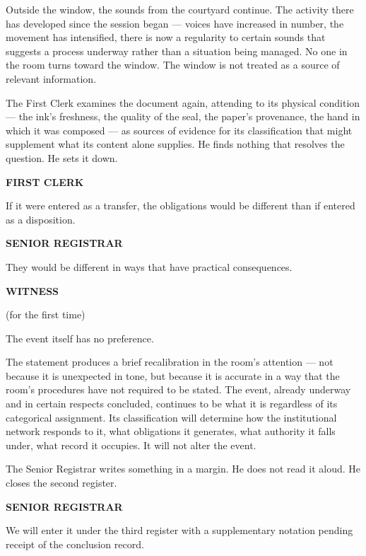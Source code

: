 \documentclass[12pt, oneside]{article}
\newenvironment{action}{%
  \vspace{0.6em}%
  \noindent\ignorespaces%
}{%
  \par\vspace{0.6em}%
}
\newcommand{\character}[1]{%
  \vspace{0.8em}%
  \begin{center}%
    \bfseries\MakeUppercase{#1}%
  \end{center}%
  \vspace{-0.3em}%
}
\newenvironment{dialogue}{%
  \vspace{0.2em}%
  \begin{list}{}{%
    \setlength{\leftmargin}{1.2in}%
    \setlength{\rightmargin}{0.8in}%
    \setlength{\itemsep}{0.6em}%
    \setlength{\parsep}{0pt}%
  }%
}{%
  \end{list}%
  \vspace{0.4em}%
}
\newcommand{\says}[2]{%
  \character{#1}%
  \begin{dialogue}\item #2\end{dialogue}%
}
\begin{document}
\begin{action}
Outside the window, the sounds from the courtyard continue. The activity there has developed since the session began --- voices have increased in number, the movement has intensified, there is now a regularity to certain sounds that suggests a process underway rather than a situation being managed. No one in the room turns toward the window. The window is not treated as a source of relevant information.

The First Clerk examines the document again, attending to its physical condition --- the ink's freshness, the quality of the seal, the paper's provenance, the hand in which it was composed --- as sources of evidence for its classification that might supplement what its content alone supplies. He finds nothing that resolves the question. He sets it down.
\end{action}

\says{First Clerk}{If it were entered as a transfer, the obligations would be different than if entered as a disposition.}

\says{Senior Registrar}{They would be different in ways that have practical consequences.}

\says{Witness}{\upshape (for the first time)} The event itself has no preference.

\begin{action}
The statement produces a brief recalibration in the room's attention --- not because it is unexpected in tone, but because it is accurate in a way that the room's procedures have not required to be stated. The event, already underway and in certain respects concluded, continues to be what it is regardless of its categorical assignment. Its classification will determine how the institutional network responds to it, what obligations it generates, what authority it falls under, what record it occupies. It will not alter the event.

The Senior Registrar writes something in a margin. He does not read it aloud. He closes the second register.
\end{action}

\says{Senior Registrar}{We will enter it under the third register with a supplementary notation pending receipt of the conclusion record.}
\end{document}
